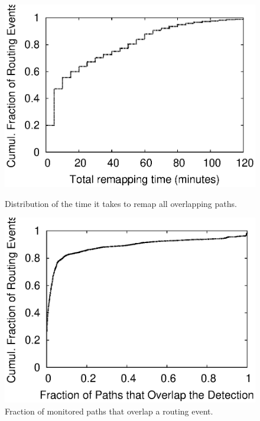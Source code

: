 \newcommand{\lczd}{\ensuremath\mathrm{\textsc{lczd}}}
\newcommand{\cps}{\ensuremath\mathrm{\textsc{cps}}}

\begin{figure}
\vspace{5mm}
\begin{minipage}{0.32\textwidth}
\includegraphics[width=1.05\columnwidth]{figs/patching/durationdetection/durationdetection.eps}
\caption{Distribution of the time it takes to remap all overlapping paths.}
\label{fig:overlap.delay.cdf}
%
\end{minipage}
\hfill
\begin{minipage}{0.32\textwidth}
\includegraphics[width=1.05\columnwidth]{figs/patching/routesoverlapping/routesoverlapping.eps}
\caption{Fraction of monitored paths that overlap a routing event.}

\end{minipage}
\end{figure}
